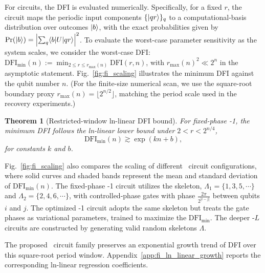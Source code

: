 \documentclass[reprint, aps, prl, superscriptaddress]{revtex4-2}
\newcommand{\myqc}{\text{HP}}
\newcommand{\fii}{\mathrm{DFI}}
\newtheorem{theorem}{Theorem}
\begin{document}
For \myqc{} circuits, the DFI is evaluated numerically. Specifically, for a fixed $r$, the circuit maps the periodic input components $\{\ket{qr}\}_q$ to a computational-basis distribution over outcomes $\ket{b}$, with the exact probabilities given by $\mathrm{Pr}(\ket{b}) = \left|\sum_q \langle b|U|qr\rangle\right|^2$.
To evaluate the worst-case parameter sensitivity as the system scales, we consider the
worst-case DFI: $\fii_{\min}(n):=\min_{2 \leq r \leq r_{\max}(n)} \fii(r,n)$, with \(r_{\max}(n)^2\ll 2^n\) in the asymptotic statement.
Fig.~\ref{fig:fi_scaling} illustrates the minimum DFI against the qubit number $n$. (For the finite-size numerical scan, we use the square-root boundary proxy \(r_{\max}(n)=\lfloor 2^{n/2}\rfloor\), matching the period scale used in the recovery experiments.)

\begin{theorem}[Restricted-window ln-linear DFI bound]
\label{thm:hp1_first_order_fisher_transfer_maintext}
For fixed-phase \myqc-1, the minimum DFI follows the ln-linear lower bound
under \(2<r<2^{n/4}\),
\begin{equation}
    \fii_{\min}(n)
    \gtrsim
    \exp(kn+b),
    \label{eq:hp1_restricted_window_ln_linear_bound_maintext}
\end{equation}
for constants \(k\) and \(b\).
\end{theorem}

Fig.~\ref{fig:fi_scaling} also compares the scaling of different \myqc~circuit configurations, where solid curves and shaded bands represent the mean and standard deviation of $\fii_{\min}(n)$. The fixed-phase \myqc-1 circuit utilizes the skeleton, $\Lambda_1 = \{1,3,5, \cdots\}$ and $\Lambda_2 = \{2,4,6, \cdots\}$, with controlled-phase gates with phase $\frac{2\pi}{2^{|i-j|}}$ between qubits $i$ and $j$. The optimized \myqc-1 circuit adopts the same skeleton but treats the gate phases as variational parameters, trained to maximize the $\fii_{\min}$. The deeper \myqc{}-$L$ circuits are constructed by generating valid random skeletons $\Lambda$. 

The proposed \myqc~circuit family preserves an exponential growth trend of DFI over this square-root period window. Appendix~\ref{app:fi_ln_linear_growth} reports the corresponding ln-linear regression coefficients.
\end{document}
